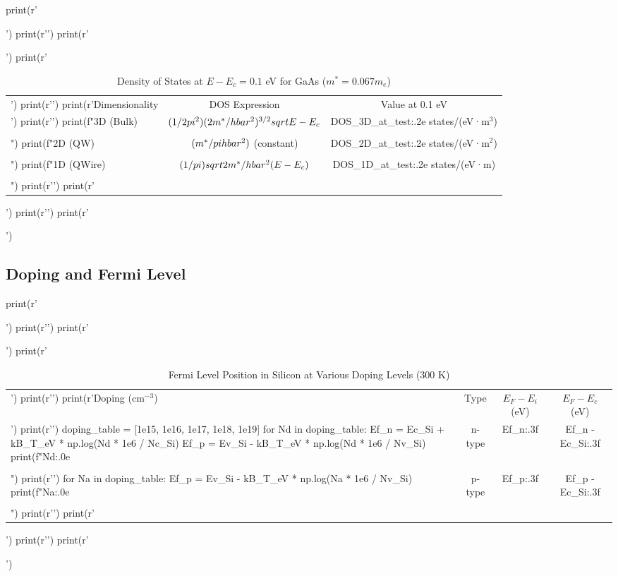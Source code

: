 \documentclass[11pt,a4paper]{article}
\begin{document}
\begin{pycode}
print(r'\begin{table}[H]')
print(r'\centering')
print(r'\caption{Density of States at $E - E_c = 0.1$ eV for GaAs ($m^* = 0.067 m_e$)}')
print(r'\begin{tabular}{@{}lcc@{}}')
print(r'\toprule')
print(r'Dimensionality & DOS Expression & Value at 0.1 eV \\')
print(r'\midrule')
print(f"3D (Bulk) & $(1/2\\pi^2)(2m^*/\\hbar^2)^{{3/2}}\\sqrt{{E-E_c}}$ & {DOS_3D_at_test:.2e} states/(eV·m$^3$) \\\\")
print(f"2D (QW) & $(m^*/\\pi\\hbar^2)$ (constant) & {DOS_2D_at_test:.2e} states/(eV·m$^2$) \\\\")
print(f"1D (QWire) & $(1/\\pi)\\sqrt{{2m^*/\\hbar^2(E-E_c)}}$ & {DOS_1D_at_test:.2e} states/(eV·m) \\\\")
print(r'\bottomrule')
print(r'\end{tabular}')
print(r'\label{tab:dos}')
print(r'\end{table}')
\end{pycode}

\subsection{Doping and Fermi Level}

\begin{pycode}
print(r'\begin{table}[H]')
print(r'\centering')
print(r'\caption{Fermi Level Position in Silicon at Various Doping Levels (300 K)}')
print(r'\begin{tabular}{@{}lccc@{}}')
print(r'\toprule')
print(r'Doping (cm$^{-3}$) & Type & $E_F - E_i$ (eV) & $E_F - E_c$ (eV) \\')
print(r'\midrule')
doping_table = [1e15, 1e16, 1e17, 1e18, 1e19]
for Nd in doping_table:
    Ef_n = Ec_Si + kB_T_eV * np.log(Nd * 1e6 / Nc_Si)
    Ef_p = Ev_Si - kB_T_eV * np.log(Nd * 1e6 / Nv_Si)
    print(f"{Nd:.0e} & n-type & {Ef_n:.3f} & {Ef_n - Ec_Si:.3f} \\\\")
print(r'\midrule')
for Na in doping_table:
    Ef_p = Ev_Si - kB_T_eV * np.log(Na * 1e6 / Nv_Si)
    print(f"{Na:.0e} & p-type & {Ef_p:.3f} & {Ef_p - Ec_Si:.3f} \\\\")
print(r'\bottomrule')
print(r'\end{tabular}')
print(r'\label{tab:doping}')
print(r'\end{table}')
\end{pycode}
\end{document}
